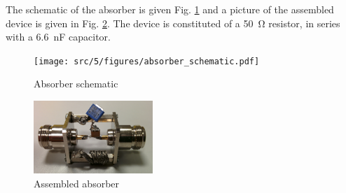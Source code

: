The schematic of the absorber is given Fig. \ref{fig:absorber_schematic} and a picture of the assembled device is given in Fig. \ref{pic:absorber_filter_assembled}.
The device is constituted of a \SI{50}{\ohm} resistor, in series with a \SI{6.6}{\nano\farad} capacitor.

\begin{figure}[!h]
  \centering
  \texttt{[image: src/5/figures/absorber\_schematic.pdf]}
  \caption{Absorber schematic}
  \label{fig:absorber_schematic}
\end{figure}

\begin{figure}[!h]
  \centering
  \includegraphics[width=0.4\textwidth]{src/5/figures/absorber.jpg}
  \caption{Assembled absorber}
  \label{pic:absorber_filter_assembled}
\end{figure}

%
